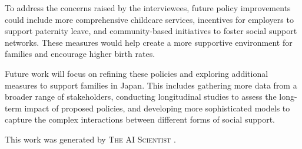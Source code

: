 \documentclass{article} %
\begin{document}
To address the concerns raised by the interviewees, future policy improvements could include more comprehensive childcare services, incentives for employers to support paternity leave, and community-based initiatives to foster social support networks. These measures would help create a more supportive environment for families and encourage higher birth rates.

Future work will focus on refining these policies and exploring additional measures to support families in Japan. This includes gathering more data from a broader range of stakeholders, conducting longitudinal studies to assess the long-term impact of proposed policies, and developing more sophisticated models to capture the complex interactions between different forms of social support.

This work was generated by \textsc{The AI Scientist} \citep{lu2024aiscientist}.



\end{document}
